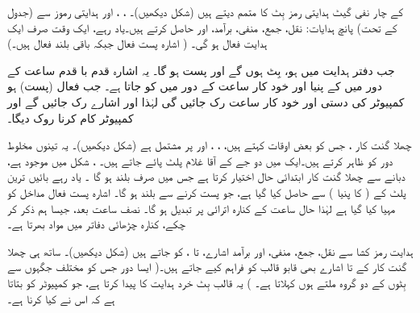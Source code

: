  کے چار   نفی گیٹ  ہدایتی رمز بِٹ  کا متمم دیتے ہیں (شکل  دیکھیں)۔ ، ، اور ہدایتی  رموز سے  (جدول  کے تحت) پانچ  ہدایات: نقل، جمع، منفی، برآمد، اور  حاصل کرتے ہیں۔یاد رہے، ایک وقت صرف ایک ہدایت فعال ہو گی۔ ( اشارہ پست فعال جبکہ باقی بلند فعال ہیں۔)

جب   دفتر ہدایت میں  ہو،  بِٹ  ہوں گے اور    پست ہو گا۔ یہ اشارہ   قدم با قدم  ساعت  کے  دور  میں   کے پنیا  اور خود کار ساعت کے دور میں  کو جاتا ہے۔  جب    فعال (پست) ہو کمپیوٹر کی دستی اور خود کار  ساعت  رک جائیں گی  لہٰذا  اور  اشارے رک جائیں گے اور کمپیوٹر  کام کرنا روک  دیگا۔

چھلا گنت کار ، جس کو بعض اوقات کہتے ہیں، ، ، اور  پر مشتمل ہے (شکل  دیکھیں)۔ یہ  تینوں  مخلوط دور  کو ظاہر کرتے ہیں۔ایک  میں  دو جے کے آقا غلام پلٹ پائے جاتے ہیں۔ ، شکل  میں موجود ہے،  دبانے سے   چھلا گنت کار  ابتدائی  حال اختیار کرتا ہے جس میں صرف  بلند ہو گا ۔ یاد رہے  بائیں ترین پلٹ کے  ( کا پنیا ) سے  حاصل کیا گیا ہے، جو  پست  کرنے سے  بلند ہو گا۔  اشارہ  پست فعال مداخل کو مہیا کیا گیا ہے لہٰذا  حال ساعت کے کنارہ اترائی پر تبدیل ہو گا۔ نصف ساعت بعد، جیسا ہم ذکر کر چکے، کنارہ چڑھائی  دفاتر میں مواد بھرتا  ہے۔

ہدایت رمز کشا سے نقل، جمع، منفی،  اور  برآمد  اشارے،  تا ، کو جاتے ہیں (شکل  دیکھیں)۔ ساتھ ہی چھلا گنت کار کے  تا   اشارے بھی قابو قالب کو فراہم کیے جاتے ہیں۔( ایسا  دور جس کو  مختلف جگہوں سے بِٹوں کے دو گروہ ملتے ہوں کہلاتا ہے۔ ) یہ قالب  بِٹ  خرد ہدایت کا  پیدا کرتا ہے، جو کمپیوٹر کو بتاتا ہے کہ اس نے کیا کرنا ہے۔

